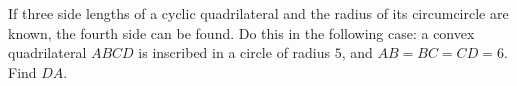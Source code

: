 If three side lengths of a cyclic quadrilateral and the radius of its circumcircle are known, the fourth side can be found. Do this in the following case: a convex quadrilateral $ABCD$ is inscribed in a circle of radius $5$, and $AB=BC=CD=6$. Find $DA$.
